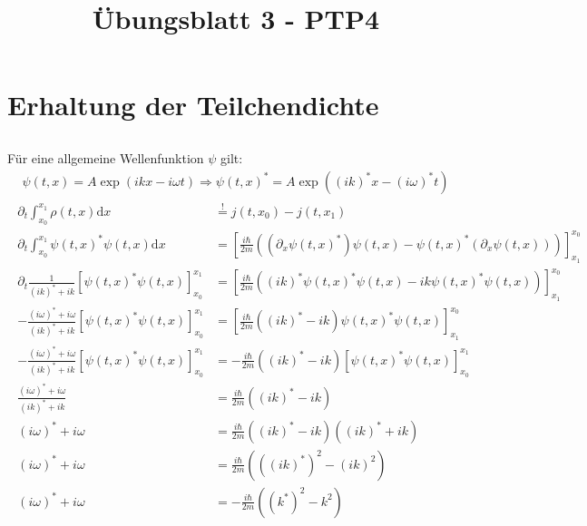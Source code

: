 \documentclass[a4paper,11pt]{article}
\title{Übungsblatt 3 - PTP4}
\author{}
\date{}
\begin{document}
\maketitle

\section{Erhaltung der Teilchendichte}

\subsection{}
Für eine allgemeine Wellenfunktion $\psi$ gilt:
\begin{align}
        \psi(t, x) = A\exp(ikx -i\omega t) \Rightarrow \psi(t, x)^* = A\exp((ik)^*x - (i\omega)^*t)
\end{align}
\begin{align}
        \begin{split}
                \partial_t \int_{x_0}^{x_1} \rho(t, x)\text{d}x &\overset{!}{=} j(t, x_0) - j(t, x_1) \\
                \partial_t \int_{x_0}^{x_1} \psi(t, x)^*\psi(t, x)\text{d}x &= \left\lbrack\frac{i\hbar}{2m}\left(\left(\partial_x \psi(t, x)^*\right)\psi(t, x) - \psi(t, x)^*\left(\partial_x\psi(t, x)\right)\right)\right\rbrack_{x_1}^{x_0} \\
                \partial_t \frac{1}{(ik)^* + ik} [\psi(t, x)^*\psi(t, x)]_{x_0}^{x_1} &= \left\lbrack\frac{i\hbar}{2m}\left((ik)^*\psi(t, x)^*\psi(t, x) - ik\psi(t, x)^*\psi(t, x)\right)\right\rbrack_{x_1}^{x_0} \\
                -\frac{(i\omega)^* + i\omega}{(ik)^* + ik} [\psi(t, x)^*\psi(t, x)]_{x_0}^{x_1} &= \left\lbrack\frac{i\hbar}{2m}((ik)^* - ik)\psi(t, x)^*\psi(t, x)\right\rbrack_{x_1}^{x_0} \\
                -\frac{(i\omega)^* + i\omega}{(ik)^* + ik} [\psi(t, x)^*\psi(t, x)]_{x_0}^{x_1} &= -\frac{i\hbar}{2m}((ik)^* - ik)[\psi(t, x)^*\psi(t, x)]_{x_0}^{x_1} \\
                \frac{(i\omega)^* + i\omega}{(ik)^* + ik} &= \frac{i\hbar}{2m}((ik)^* - ik) \\
                (i\omega)^* + i\omega &= \frac{i\hbar}{2m}((ik)^* - ik)((ik)^* + ik) \\
                (i\omega)^* + i\omega &= \frac{i\hbar}{2m}(((ik)^*)^2 - (ik)^2) \\
                (i\omega)^* + i\omega &= -\frac{i\hbar}{2m}((k^*)^2 - k^2) \\
        \end{split}
\end{align}
\end{document}
